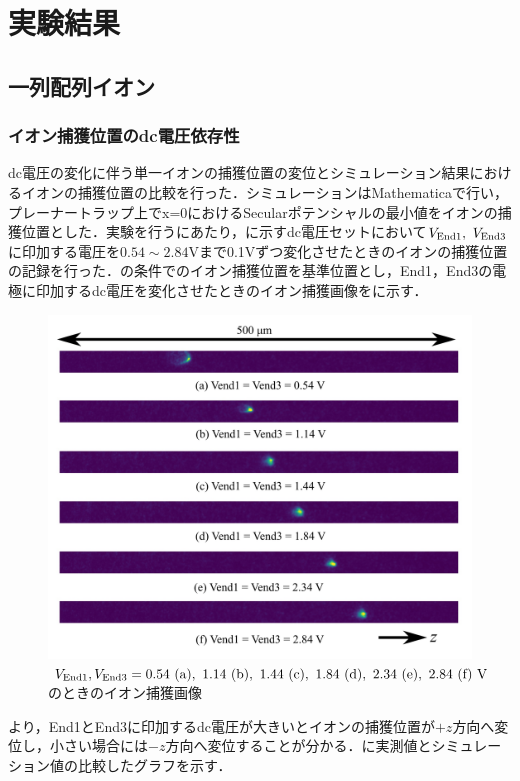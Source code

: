 \chapter{実験結果}
\section{一列配列イオン}
\subsection{イオン捕獲位置のdc電圧依存性}
dc電圧の変化に伴う単一イオンの捕獲位置の変位とシミュレーション結果におけるイオンの捕獲位置の比較を行った．シミュレーションはMathematicaで行い，プレーナートラップ上でx=0におけるSecularポテンシャルの最小値をイオンの捕獲位置とした．実験を行うにあたり，に示すdc電圧セットにおいて$V_{\rm End1}, \ V_{\rm End3}$に印加する電圧を$0.54 \sim 2.84$Vまで0.1Vずつ変化させたときのイオンの捕獲位置の記録を行った．の条件でのイオン捕獲位置を基準位置とし，End1，End3の電極に印加するdc電圧を変化させたときのイオン捕獲画像をに示す．
\begin{figure}[h]
	\begin{center}
		\includegraphics[width = 0.6 \linewidth]{./results/figure/displacement_End_Odd.png}
		\caption{$V_{\rm End1}, V_{\rm End3} = 0.54{\rm \ (a)}, \ 1.14{\rm \ (b)}, \ 1.44{\rm \ (c)}, \ 1.84{\rm \ (d)}, \ 2.34{\rm \ (e)}, \ 2.84{\rm \ (f)} \ {\rm V}$のときのイオン捕獲画像}
		\label{fig:displacement_End13}
	\end{center}
\end{figure}

より，End1とEnd3に印加するdc電圧が大きいとイオンの捕獲位置が$+z$方向へ変位し，小さい場合には$-z$方向へ変位することが分かる．に実測値とシミュレーション値の比較したグラフを示す．

